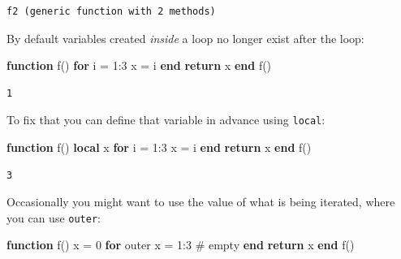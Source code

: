 \documentclass[
]{article}
\newenvironment{Shaded}{\begin{snugshade}}{\end{snugshade}}
\newcommand{\CommentTok}[1]{\textcolor[rgb]{0.37,0.37,0.37}{#1}}
\newcommand{\ControlFlowTok}[1]{\textcolor[rgb]{0.00,0.23,0.31}{\textbf{#1}}}
\newcommand{\FloatTok}[1]{\textcolor[rgb]{0.68,0.00,0.00}{#1}}
\newcommand{\FunctionTok}[1]{\textcolor[rgb]{0.28,0.35,0.67}{#1}}
\newcommand{\KeywordTok}[1]{\textcolor[rgb]{0.00,0.23,0.31}{\textbf{#1}}}
\newcommand{\NormalTok}[1]{\textcolor[rgb]{0.00,0.23,0.31}{#1}}
\newcommand{\OperatorTok}[1]{\textcolor[rgb]{0.37,0.37,0.37}{#1}}
\begin{document}
\begin{verbatim}
f2 (generic function with 2 methods)
\end{verbatim}

By default variables created \emph{inside} a loop no longer exist after
the loop:

\begin{Shaded}
\begin{Highlighting}[]
\KeywordTok{function} \FunctionTok{f}\NormalTok{()}
   \ControlFlowTok{for}\NormalTok{ i }\OperatorTok{=} \FloatTok{1}\OperatorTok{:}\FloatTok{3}
\NormalTok{   x }\OperatorTok{=}\NormalTok{ i}
   \ControlFlowTok{end}
   \ControlFlowTok{return}\NormalTok{ x}
\KeywordTok{end}
\FunctionTok{f}\NormalTok{()}
\end{Highlighting}
\end{Shaded}

\begin{verbatim}
1
\end{verbatim}

To fix that you can define that variable in advance using
\texttt{local}:

\begin{Shaded}
\begin{Highlighting}[]
\KeywordTok{function} \FunctionTok{f}\NormalTok{()}
   \KeywordTok{local}\NormalTok{ x}
   \ControlFlowTok{for}\NormalTok{ i }\OperatorTok{=} \FloatTok{1}\OperatorTok{:}\FloatTok{3}
\NormalTok{   x }\OperatorTok{=}\NormalTok{ i}
   \ControlFlowTok{end}
   \ControlFlowTok{return}\NormalTok{ x}
\KeywordTok{end}
\FunctionTok{f}\NormalTok{()}
\end{Highlighting}
\end{Shaded}

\begin{verbatim}
3
\end{verbatim}

Occasionally you might want to use the value of what is being iterated,
where you can use \texttt{outer}:

\begin{Shaded}
\begin{Highlighting}[]
\KeywordTok{function} \FunctionTok{f}\NormalTok{()}
\NormalTok{   x }\OperatorTok{=} \FloatTok{0}
   \ControlFlowTok{for}\NormalTok{ outer x }\OperatorTok{=} \FloatTok{1}\OperatorTok{:}\FloatTok{3}
   \CommentTok{\# empty}
   \ControlFlowTok{end}
   \ControlFlowTok{return}\NormalTok{ x}
\KeywordTok{end}
\FunctionTok{f}\NormalTok{()}
\end{Highlighting}
\end{Shaded}
\end{document}
